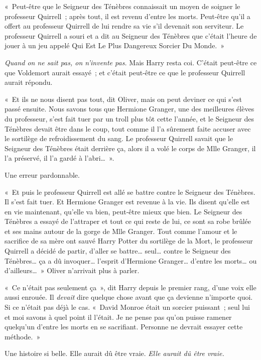 «~Peut-être que le Seigneur des Ténèbres connaissait un moyen de soigner le professeur Quirrell~; après tout, il est revenu d'entre les morts. Peut-être qu'il a offert au professeur Quirrell de lui rendre sa vie s'il devenait son serviteur. Le professeur Quirrell a souri et a dit au Seigneur des Ténèbres que c'était l'heure de jouer à un jeu appelé Qui Est Le Plus Dangereux Sorcier Du Monde.~»

\emph{Quand on ne sait pas, on n'invente pas.} Mais Harry resta coi. C'était peut-être ce que Voldemort aurait essayé~; et c'était peut-être ce que le professeur Quirrell aurait répondu.

«~Et ils ne nous disent pas tout, dit Oliver, mais on peut deviner ce qui s'est passé ensuite. Nous savons tous que Hermione Granger, une des meilleures élèves du professeur, s'est fait tuer par un troll plus tôt cette l'année, et le Seigneur des Ténèbres devait être dans le coup, tout comme il l'a sûrement faite accuser avec le sortilège de refroidissement du sang. Le professeur Quirrell savait que le Seigneur des Ténèbres était derrière ça, alors il a volé le corps de Mlle Granger, il l'a préservé, il l'a gardé à l'abri…~».

Une erreur pardonnable.

«~Et puis le professeur Quirrell est allé se battre contre le Seigneur des Ténèbres. Il s'est fait tuer. Et Hermione Granger est revenue à la vie. Ils disent qu'elle est en vie maintenant, qu'elle va bien, peut-être mieux que bien. Le Seigneur des Ténèbres a essayé de l'attraper et tout ce qui reste de lui, ce sont sa robe brûlée et ses mains autour de la gorge de Mlle Granger. Tout comme l'amour et le sacrifice de sa mère ont sauvé Harry Potter du sortilège de la Mort, le professeur Quirrell a décidé de partir, d'aller se battre… seul… contre le Seigneur des Ténèbres… ça a dû invoquer… l'esprit d'Hermione Granger… d'entre les morts… ou d'ailleurs…~» Oliver n'arrivait plus à parler.

«~Ce n'était pas seulement ça~», dit Harry depuis le premier rang, d'une voix elle aussi enrouée. Il \emph{devait} dire quelque chose avant que ça devienne n'importe quoi. Si ce n'était pas déjà le cas. «~David Monroe était un sorcier puissant~; seul lui et moi savons à quel point il l'était. Je ne pense pas qu'on puisse ramener quelqu'un d'entre les morts en se sacrifiant. Personne ne devrait essayer cette méthode.~»

Une histoire si belle. Elle aurait dû être vraie. \emph{Elle aurait dû être vraie.}

